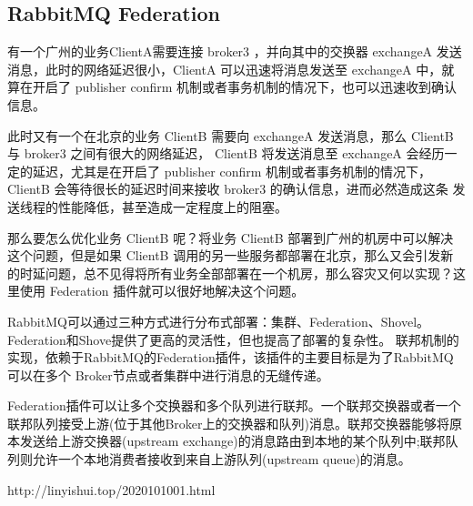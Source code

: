 \documentclass[../../../interview-questions.tex]{subfiles}
\begin{document}
\subsection{RabbitMQ Federation}

有一个广州的业务ClientA需要连接 broker3 ，并向其中的交换器 exchangeA 发送消息，此时的网络延迟很小，ClientA 可以迅速将消息发送至 exchangeA 中，就算在开启了 publisher confirm 机制或者事务机制的情况下，也可以迅速收到确认信息。

此时又有一个在北京的业务 ClientB 需要向 exchangeA 发送消息，那么 ClientB 与 broker3 之间有很大的网络延迟， ClientB 将发送消息至 exchangeA 会经历一定的延迟，尤其是在开启了 publisher confirm 机制或者事务机制的情况下， ClientB 会等待很长的延迟时间来接收 broker3 的确认信息，进而必然造成这条 发送线程的性能降低，甚至造成一定程度上的阻塞。

那么要怎么优化业务 ClientB 呢？将业务 ClientB 部署到广州的机房中可以解决这个问题，但是如果 ClientB 调用的另一些服务都部署在北京，那么又会引发新的时延问题，总不见得将所有业务全部部署在一个机房，那么容灾又何以实现？这里使用 Federation 插件就可以很好地解决这个问题。

RabbitMQ可以通过三种方式进行分布式部署：集群、Federation、Shovel。Federation和Shove提供了更高的灵活性，但也提高了部署的复杂性。
联邦机制的实现，依赖于RabbitMQ的Federation插件，该插件的主要目标是为了RabbitMQ可以在多个 Broker节点或者集群中进行消息的无缝传递。

Federation插件可以让多个交换器和多个队列进行联邦。一个联邦交换器或者一个联邦队列接受上游(位于其他Broker上的交换器和队列)消息。联邦交换器能够将原本发送给上游交换器(upstream exchange)的消息路由到本地的某个队列中;联邦队列则允许一个本地消费者接收到来自上游队列(upstream queue)的消息。

http://linyishui.top/2020101001.html
\end{document}
